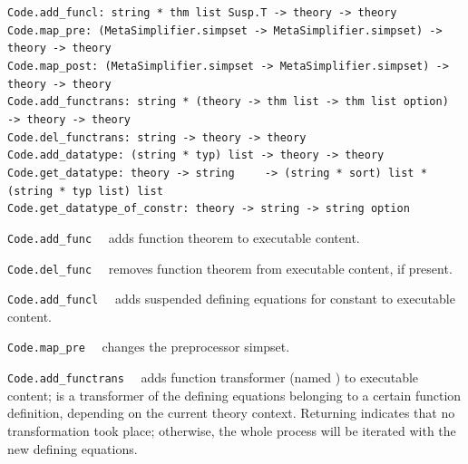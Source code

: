 \begin{isabellebody}
\begin{isamarkuptext}
\begin{mldecls}
  \verb|Code.add_funcl: string * thm list Susp.T -> theory -> theory| \\
  \verb|Code.map_pre: (MetaSimplifier.simpset -> MetaSimplifier.simpset) -> theory -> theory| \\
  \verb|Code.map_post: (MetaSimplifier.simpset -> MetaSimplifier.simpset) -> theory -> theory| \\
  \verb|Code.add_functrans: string * (theory -> thm list -> thm list option)|\isasep\isanewline%
\verb|    -> theory -> theory| \\
  \verb|Code.del_functrans: string -> theory -> theory| \\
  \verb|Code.add_datatype: (string * typ) list -> theory -> theory| \\
  \verb|Code.get_datatype: theory -> string|\isasep\isanewline%
\verb|    -> (string * sort) list * (string * typ list) list| \\
  \verb|Code.get_datatype_of_constr: theory -> string -> string option|
  \end{mldecls}

  \begin{description}

  \item \verb|Code.add_func|~~ adds function
     theorem  to executable content.

  \item \verb|Code.del_func|~~ removes function
     theorem  from executable content, if present.

  \item \verb|Code.add_funcl|~~ adds
     suspended defining equations  for constant
      to executable content.

  \item \verb|Code.map_pre|~~ changes
     the preprocessor simpset.

    \item \verb|Code.add_functrans|~~ adds
     function transformer  (named ) to executable content;
      is a transformer of the defining equations belonging
     to a certain function definition, depending on the
     current theory context.  Returning  indicates that no
     transformation took place;  otherwise, the whole process will be iterated
     with the new defining equations.


\end{description}
\end{isamarkuptext}
\end{isabellebody}
